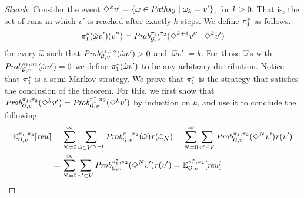 \begin{proof}[Sketch]
  Consider the event $\Diamond^{k} v' = \{ \omega \in
  \mathit{Paths}_{\mathcal{G}} \mid \omega_k = v'\}$, for $k\geq 0$. That is,
  the set of runs in which $v'$ is reached after exactly $k$ steps.
  We define $\pi^*_{1}$ as follows.
  \[
  \pi^*_{1}(\hat{\omega}v')(v'') =  \mathit{Prob}^{\pi_{1}, \pi_{2}}_{\mathcal{G},v}(\Diamond^{k+1} v'' \mid \Diamond^k v') 
  \]
  for every $\hat{\omega}$ such that $\mathit{Prob}^{\pi_{1}, \pi_{2}}_{\mathcal{G},v}(\hat{\omega}v') > 0$ and $|\hat{\omega}v'| = k$.  For those $\hat{\omega}$'s with $\mathit{Prob}^{\pi_{1}, \pi_{2}}_{\mathcal{G},v}(\hat{\omega}v') = 0$ we define $\pi^*_{1}(\hat{\omega}v')$ to be any arbitrary distribution.
  Notice that $\pi^*_{1}$ is a semi-Markov strategy.
  We prove that $\pi^*_{1}$ is the strategy that satisfies the
  conclusion of the theorem.
  For this, we first show that $\mathit{Prob}^{\pi_{1}, \pi_{2}}_{\mathcal{G},v}(\Diamond^{k} v') = \mathit{Prob}^{\pi^*_{1}, \pi_{2}}_{\mathcal{G},v}(\Diamond^{k} v')$ by induction on $k$, and use it to conclude the following. 
  \begin{align*}
  \mathbb{E}^{\pi_{1}, \pi_{2}}_{\mathcal{G},v}[\textit{rew}]   &  = \sum^\infty_{N=0} \sum_{\hat{\omega} \in V^{N+1}} \mathit{Prob}^{\pi_{1}, \pi_{2}}_{\mathcal{G},v}(\hat{\omega})\mathit{r}(\hat{\omega}_N)
   = \sum^\infty_{N=0} \sum_{v' \in V} \mathit{Prob}^{\pi_{1}, \pi_{2}}_{\mathcal{G},v}(\Diamond^N v')\mathit{r}(v') \\
  & =  \sum^\infty_{N=0} \sum_{v' \in V} \mathit{Prob}^{\pi^*_{1}, \pi_{2}}_{\mathcal{G},v}(\Diamond^N v')\mathit{r}(v') 
   = \mathbb{E}^{\pi^*_{1}, \pi_{2}}_{\mathcal{G},v}[\textit{rew}] \tag*{\qedhere}
  \end{align*}

\end{proof}
